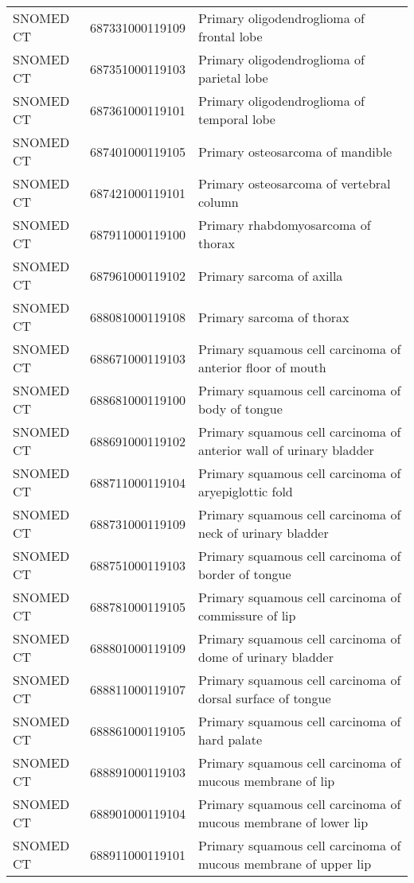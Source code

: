 \begin{longtable}{p{}p{}p{}}
  SNOMED CT & 687331000119109 & Primary oligodendroglioma of frontal lobe \\ 
  SNOMED CT & 687351000119103 & Primary oligodendroglioma of parietal lobe \\ 
  SNOMED CT & 687361000119101 & Primary oligodendroglioma of temporal lobe \\ 
  SNOMED CT & 687401000119105 & Primary osteosarcoma of mandible \\ 
  SNOMED CT & 687421000119101 & Primary osteosarcoma of vertebral column \\ 
  SNOMED CT & 687911000119100 & Primary rhabdomyosarcoma of thorax \\ 
  SNOMED CT & 687961000119102 & Primary sarcoma of axilla \\ 
  SNOMED CT & 688081000119108 & Primary sarcoma of thorax \\ 
  SNOMED CT & 688671000119103 & Primary squamous cell carcinoma of anterior floor of mouth \\ 
  SNOMED CT & 688681000119100 & Primary squamous cell carcinoma of body of tongue \\ 
  SNOMED CT & 688691000119102 & Primary squamous cell carcinoma of anterior wall of urinary bladder \\ 
  SNOMED CT & 688711000119104 & Primary squamous cell carcinoma of aryepiglottic fold \\ 
  SNOMED CT & 688731000119109 & Primary squamous cell carcinoma of neck of urinary bladder \\ 
  SNOMED CT & 688751000119103 & Primary squamous cell carcinoma of border of tongue \\ 
  SNOMED CT & 688781000119105 & Primary squamous cell carcinoma of commissure of lip \\ 
  SNOMED CT & 688801000119109 & Primary squamous cell carcinoma of dome of urinary bladder \\ 
  SNOMED CT & 688811000119107 & Primary squamous cell carcinoma of dorsal surface of tongue \\ 
  SNOMED CT & 688861000119105 & Primary squamous cell carcinoma of hard palate \\ 
  SNOMED CT & 688891000119103 & Primary squamous cell carcinoma of mucous membrane of lip \\ 
  SNOMED CT & 688901000119104 & Primary squamous cell carcinoma of mucous membrane of lower lip \\ 
  SNOMED CT & 688911000119101 & Primary squamous cell carcinoma of mucous membrane of upper lip \\ 

\end{longtable}
